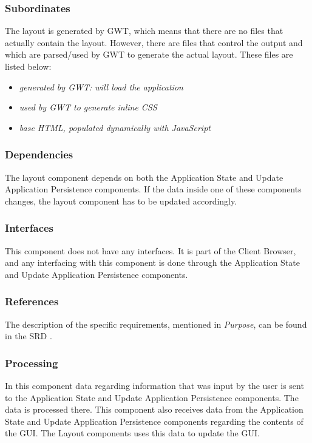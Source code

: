 \subsubsection*{Subordinates}
The layout is generated by GWT, which means that there are no files that actually contain the layout. However, there are files that control the output and which are parsed/used by GWT to generate the actual layout. These files are listed below:
\begin{itemize}
	\item {}  \emph{generated by GWT: will load the application}
	\item {}         \emph{used by GWT to generate inline CSS}
	\item {}        \emph{base HTML, populated dynamically with JavaScript}
\end{itemize}

\subsubsection*{Dependencies}
The layout component depends on both the Application State and Update Application Persistence components. If the data inside one of these components changes, the layout component has to be updated accordingly.

\subsubsection*{Interfaces}
This component does not have any interfaces. It is part of the Client Browser, and any interfacing with this component is done through the Application State and Update Application Persistence components.

\subsubsection*{References}
The description of the specific requirements, mentioned in \emph{Purpose}, can be found in the SRD \cite{srd}.

\subsubsection*{Processing}
In this component data regarding information that was input by the user is sent to the Application State and Update Application Persistence components. The data is processed there. This component also receives data from the Application State and Update Application Persistence components regarding the contents of the GUI. The Layout components uses this data to update the GUI.

